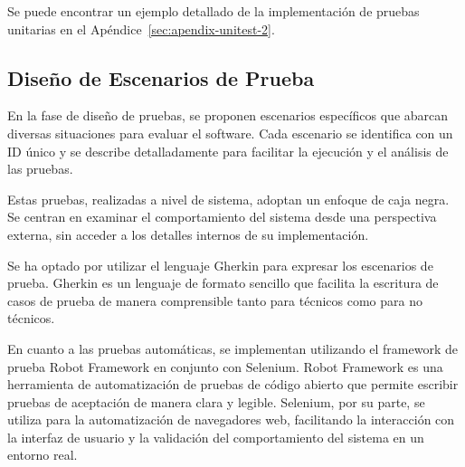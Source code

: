 Se puede encontrar un ejemplo detallado de la implementación de pruebas unitarias en el Apéndice~\ref{sec:apendix-unitest-2}.

\subsection{Diseño de Escenarios de Prueba}
En la fase de diseño de pruebas, se proponen escenarios específicos que abarcan diversas situaciones para evaluar el software. Cada escenario se identifica con un ID único y se describe detalladamente para facilitar la ejecución y el análisis de las pruebas.

Estas pruebas, realizadas a nivel de sistema, adoptan un enfoque de caja negra. Se centran en examinar el comportamiento del sistema desde una perspectiva externa, sin acceder a los detalles internos de su implementación.

Se ha optado por utilizar el lenguaje Gherkin para expresar los escenarios de prueba. Gherkin es un lenguaje de formato sencillo que facilita la escritura de casos de prueba de manera comprensible tanto para técnicos como para no técnicos.

En cuanto a las pruebas automáticas, se implementan utilizando el framework de prueba Robot Framework en conjunto con Selenium. Robot Framework es una herramienta de automatización de pruebas de código abierto que permite escribir pruebas de aceptación de manera clara y legible. Selenium, por su parte, se utiliza para la automatización de navegadores web, facilitando la interacción con la interfaz de usuario y la validación del comportamiento del sistema en un entorno real.


